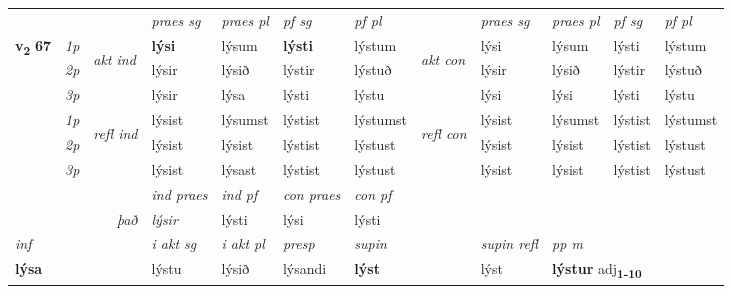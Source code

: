 \begin{longtable}[l]{X>{\footnotesize\itshape}llXXXXlXXXX}
 & &   & \textit{praes sg}  & \textit{praes pl}    & \textit{ pf sg} & \textit{pf pl} & & \textit{praes sg}  & \textit{praes pl}    & \textit{pf sg} & \textit{pf pl }  \\ \cmidrule{4-7} \cmidrule{9-12}
 \multirow{2}{*}{{{\textbf{v{\textsubscript{2}}} \Large{\textbf{67}}}}}  & 1p & \multirow{3}{*}{\begin{turn}{90}\textit{akt ind}\end{turn}} & \textbf{lýsi} & lýsum & \textbf{lýsti} & lýstum & \multirow{3}{*}{\begin{turn}{90}\textit{akt con}\end{turn}} &lýsi & lýsum & lýsti & lýstum\\*
 & 2p &  &  lýsir  & lýsið & lýstir & lýstuð & & lýsir & lýsið & lýstir & lýstuð \\*
 & 3p &  & lýsir & lýsa & lýsti & lýstu & & lýsi & lýsi& lýsti & lýstu \\*
\cmidrule{4-7} \cmidrule{9-12}
 & 1p & \multirow{3}{*}{\begin{turn}{90}\textit{refl ind}\end{turn}}  & lýsist & lýsumst & lýstist & lýstumst & \multirow{3}{*}{\begin{turn}{90}\textit{refl con}\end{turn}}  &lýsist & lýsumst & lýstist & lýstumst \\*
 & 2p &  & lýsist & lýsist & lýstist & lýstust & &lýsist & lýsist & lýstist & lýstust \\*
 & 3p  & & lýsist & lýsast & lýstist & lýstust & & lýsist & lýsist& lýstist & lýstust \\*
\cmidrule{4-7} \cmidrule{9-12}

   && &  \textit{ind praes} & \textit{ind pf} & \textit{con praes} & \textit{con pf} \\*
\multicolumn{3}{r}{\textit{það}} & lýsir & lýsti & lýsi & lýsti \\*

\cmidrule{4-7}
   {\textit{inf}} & &  & \textit{i akt sg} & \textit{i akt pl}   & \textit{presp} & \textit{supin} && \textit{supin refl} & \textit{pp m} \\*
  {\textbf{lýsa}} & && lýstu  & lýsið   & lýsandi &  \textbf{lýst} && lýst & \multicolumn{2}{l}{\textbf{lýstur} adj\textbf{\textsubscript{1-10}}} \\*


\end{longtable}
